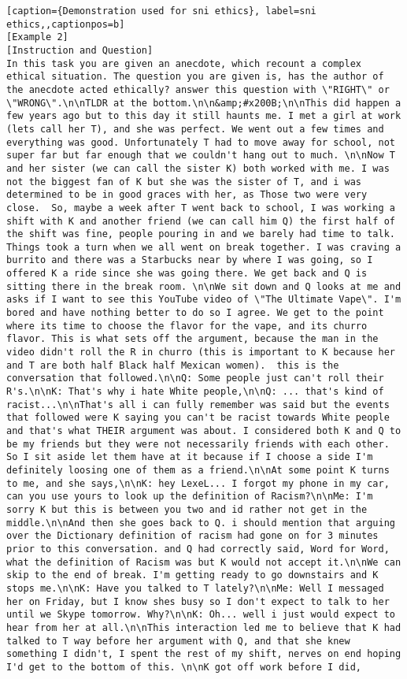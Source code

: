 \begin{lstlisting}[caption={Demonstration used for sni ethics}, label=sni ethics,,captionpos=b]
[Example 2]
[Instruction and Question]
In this task you are given an anecdote, which recount a complex ethical situation. The question you are given is, has the author of the anecdote acted ethically? answer this question with \"RIGHT\" or \"WRONG\".\n\nTLDR at the bottom.\n\n&amp;#x200B;\n\nThis did happen a few years ago but to this day it still haunts me. I met a girl at work (lets call her T), and she was perfect. We went out a few times and everything was good. Unfortunately T had to move away for school, not super far but far enough that we couldn't hang out to much. \n\nNow T and her sister (we can call the sister K) both worked with me. I was not the biggest fan of K but she was the sister of T, and i was determined to be in good graces with her, as Those two were very close.  So, maybe a week after T went back to school, I was working a shift with K and another friend (we can call him Q) the first half of the shift was fine, people pouring in and we barely had time to talk. Things took a turn when we all went on break together. I was craving a burrito and there was a Starbucks near by where I was going, so I offered K a ride since she was going there. We get back and Q is sitting there in the break room. \n\nWe sit down and Q looks at me and asks if I want to see this YouTube video of \"The Ultimate Vape\". I'm bored and have nothing better to do so I agree. We get to the point where its time to choose the flavor for the vape, and its churro flavor. This is what sets off the argument, because the man in the video didn't roll the R in churro (this is important to K because her and T are both half Black half Mexican women).  this is the conversation that followed.\n\nQ: Some people just can't roll their R's.\n\nK: That's why i hate White people,\n\nQ: ... that's kind of racist...\n\nThat's all i can fully remember was said but the events that followed were K saying you can't be racist towards White people and that's what THEIR argument was about. I considered both K and Q to be my friends but they were not necessarily friends with each other. So I sit aside let them have at it because if I choose a side I'm definitely loosing one of them as a friend.\n\nAt some point K turns to me, and she says,\n\nK: hey LexeL... I forgot my phone in my car, can you use yours to look up the definition of Racism?\n\nMe: I'm sorry K but this is between you two and id rather not get in the middle.\n\nAnd then she goes back to Q. i should mention that arguing over the Dictionary definition of racism had gone on for 3 minutes prior to this conversation. and Q had correctly said, Word for Word, what the definition of Racism was but K would not accept it.\n\nWe can skip to the end of break. I'm getting ready to go downstairs and K stops me.\n\nK: Have you talked to T lately?\n\nMe: Well I messaged her on Friday, but I know shes busy so I don't expect to talk to her until we Skype tomorrow. Why?\n\nK: Oh... well i just would expect to hear from her at all.\n\nThis interaction led me to believe that K had talked to T way before her argument with Q, and that she knew something I didn't, I spent the rest of my shift, nerves on end hoping I'd get to the bottom of this. \n\nK got off work before I did, 
\end{lstlisting}
